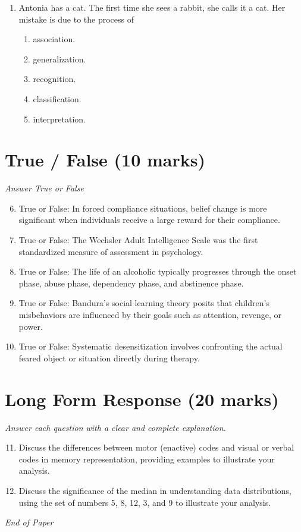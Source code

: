 \documentclass[12pt]{article}
\begin{document}
\begin{enumerate}[label=\arabic*.]
the role of:"
\begin{enumerate}[label=(\alph*)]
    \item consultant.
    \item supervisor.
    \item faculty member.
    \item researcher.
    \item clinical director.
\end{enumerate}
\item Antonia has a cat. The first time she sees a rabbit, she calls it a cat. Her mistake is
due to the process of
\begin{enumerate}[label=(\alph*)]
    \item association.
    \item generalization.
    \item recognition.
    \item classification.
    \item interpretation.
\end{enumerate}
\end{enumerate}

\section*{True / False (10 marks)}
\textit{Answer True or False}
\begin{enumerate}[label=\arabic*.]
\setcounter{enumi}{5}
\item True or False: In forced compliance situations, belief change is more significant when individuals receive a large reward for their compliance.
\item True or False: The Wechsler Adult Intelligence Scale was the first standardized measure of assessment in psychology.
\item True or False: The life of an alcoholic typically progresses through the onset phase, abuse phase, dependency phase, and abstinence phase.
\item True or False: Bandura's social learning theory posits that children's misbehaviors are influenced by their goals such as attention, revenge, or power.
\item True or False: Systematic desensitization involves confronting the actual feared object or situation directly during therapy.
\end{enumerate}

\section*{Long Form Response (20 marks)}
\textit{Answer each question with a clear and complete explanation.}
\begin{enumerate}[label=\arabic*.]
\setcounter{enumi}{10}
\item Discuss the differences between motor (enactive) codes and visual or verbal codes in
memory representation, providing examples to illustrate your analysis.
\item Discuss the significance of the median in understanding data distributions, using the set
of numbers 5, 8, 12, 3, and 9 to illustrate your analysis.
\end{enumerate}

\vfill
\noindent\textit{End of Paper}
\end{document}
